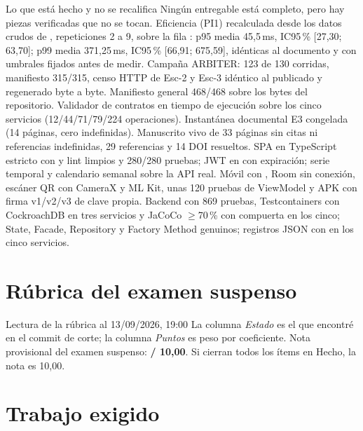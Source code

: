 \begin{logro}{Lo que est\'a hecho y no se recalifica}
Ning\'un entregable est\'a completo, pero hay piezas verificadas que no se tocan. Eficiencia (PI1) recalculada desde los datos crudos de , repeticiones 2 a 9, sobre la fila : p95 media 45,5\,ms, IC95\,\% [27,30; 63,70]; p99 media 371,25\,ms, IC95\,\% [66,91; 675,59], id\'enticas al documento y con umbrales fijados antes de medir. Campa\~na ARBITER: 123 de 130 corridas, manifiesto 315/315, censo HTTP de Esc-2 y Esc-3 id\'entico al publicado y  regenerado byte a byte. Manifiesto general 468/468 sobre los bytes del repositorio. Validador de contratos en tiempo de ejecuci\'on sobre los cinco servicios (12/44/71/79/224 operaciones). Instant\'anea documental E3 congelada (14 p\'aginas, cero indefinidas). Manuscrito vivo de 33 p\'aginas sin citas ni referencias indefinidas, 29 referencias y 14 DOI resueltos. SPA en TypeScript estricto con  y lint limpios y 280/280 pruebas; JWT en  con expiraci\'on; serie temporal y calendario semanal sobre la API real. M\'ovil con , Room sin conexi\'on, esc\'aner QR con CameraX y ML Kit, unas 120 pruebas de ViewModel y APK con firma v1/v2/v3 de clave propia. Backend con 869 pruebas, Testcontainers con CockroachDB en tres servicios y JaCoCo $\ge$70\,\% con compuerta en los cinco; State, Facade, Repository y Factory Method genuinos; registros JSON con  en los cinco servicios.
\end{logro}

\section{R\'ubrica del examen suspenso}

\reglarubrica



\begin{nota}{Lectura de la r\'ubrica al 13/09/2026, 19:00}
La columna \emph{Estado} es el que encontr\'e en el commit de corte; la columna \emph{Puntos} es peso por coeficiente. Nota provisional del examen suspenso: \textbf{\notaprov{} / 10,00}. Si cierran todos los \'items en Hecho, la nota es 10,00.
\end{nota}

\section{Trabajo exigido}

